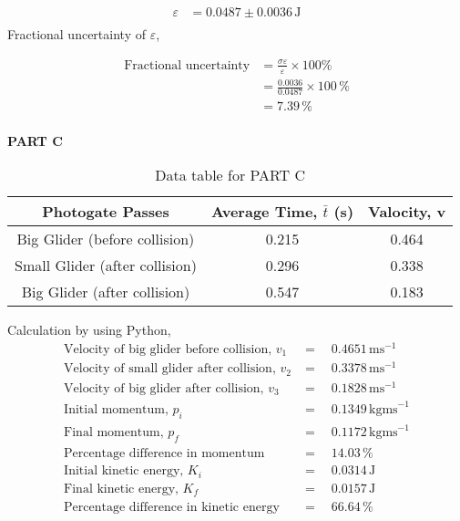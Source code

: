 \documentclass[a4paper,11pt]{article}
\begin{document}
\begin{align*}
\varepsilon &= 0.0487 \pm 0.0036 \, \text{J} \\
\end{align*}
\newpage
\noindent Fractional uncertainty of $\varepsilon$,

\begin{align*}
\text{Fractional uncertainty} &= \frac{\sigma \varepsilon}{\varepsilon} \times 100\%\\
&= \frac{0.0036}{0.0487} \times 100\,\%\\
&= 7.39\,\%
\end{align*}
\\
\noindent \textbf{PART C}
\begin{table}[h!]
\centering
\begin{tabular}{ |c|c|c| } 
\hline
Photogate Passes & Average Time, \( \bar{t} \) (s) & Valocity, v\\
\hline
Big Glider (before collision) & 0.215 & 0.464\\
\hline
Small Glider (after collision) & 0.296 & 0.338\\
\hline
Big Glider (after collision) & 0.547 & 0.183\\
\hline
\end{tabular}
\caption{Data table for PART C}
\label{table:1}
\end{table}

\noindent Calculation by using Python,
\begin{align*}
\text{Velocity of big glider before collision, $v_1$}  &= \quad 0.4651 \, \text{ms}^{-1} \\
\text{Velocity of small glider after collision, $v_2$}  &= \quad 0.3378 \, \text{ms}^{-1} \\
\text{Velocity of big glider after collision, $v_3$}  &= \quad 0.1828 \, \text{ms}^{-1} \\
\text{Initial momentum, $p_i$}  &= \quad 0.1349 \, \text{kgms}^{-1} \\
\text{Final momentum,  $p_f$}  &= \quad 0.1172 \, \text{kgms}^{-1} \\
\text{Percentage difference in momentum} &= \quad 14.03\,\% \\
\text{Initial kinetic energy, $K_i$}  &= \quad 0.0314 \, \text{J} \\
\text{Final kinetic energy, $K_f$} &=\quad 0.0157 \, \text{J} \\
\text{Percentage difference in kinetic energy} &= \quad 66.64\,\% \\
\end{align*}
\end{document}
